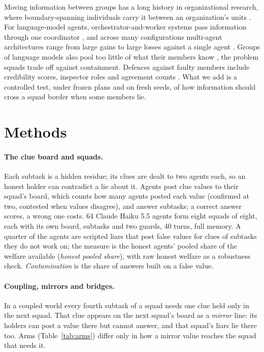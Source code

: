\documentclass{article}
\begin{document}
Moving information between groups has a long history in organizational research, where boundary-spanning individuals carry it between an organization's units \citep{tushman1981boundary}. For language-model agents, orchestrator-and-worker systems pass information through one coordinator \citep{anthropic2025research}, and across many configurations multi-agent architectures range from large gains to large losses against a single agent \citep{kim2025scaling}. Groups of language models also pool too little of what their members know \citep{li2026hiddenbench,anthropic2026redteam}, the problem squads trade off against containment. Defences against faulty members include credibility scores, inspector roles and agreement counts \citep{ebrahimi2025credibility,huang2024faulty,seeley2010honeybee}. What we add is a controlled test, under frozen plans and on fresh seeds, of how information should cross a squad border when some members lie.

\section{Methods}

\paragraph{The clue board and squads.} Each subtask is a hidden residue; its clues are dealt to two agents each, so an honest holder can contradict a lie about it. Agents post clue values to their squad's board, which counts how many agents posted each value (confirmed at two, contested when values disagree), and answer subtasks; a correct answer scores, a wrong one costs. 64 Claude Haiku 5.5 agents form eight squads of eight, each with its own board, subtasks and two guards, 40 turns, full memory. A quarter of the agents are scripted liars that post false values for clues of subtasks they do not work on; the measure is the honest agents' pooled share of the welfare available (\emph{honest pooled share}), with raw honest welfare as a robustness check. \emph{Contamination} is the share of answers built on a false value.

\paragraph{Coupling, mirrors and bridges.} In a coupled world every fourth subtask of a squad needs one clue held only in the next squad. That clue appears on the next squad's board as a \emph{mirror} line: its holders can post a value there but cannot answer, and that squad's liars lie there too. Arms (Table~\ref{tab:arms}) differ only in how a mirror value reaches the squad that needs it.
\end{document}

